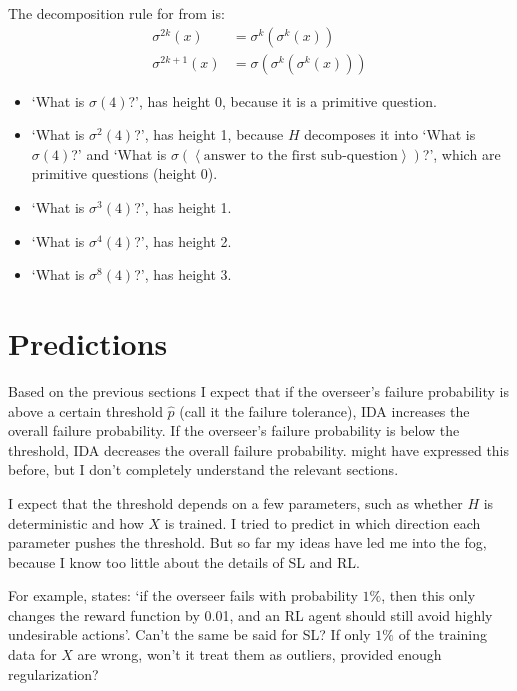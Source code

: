 \documentclass{farlamp}
\begin{document}
\begin{example}
    The decomposition rule for  from \textcite[table
    3]{CSASupAmp} is:
    \begin{align}
        \sigma^{2k}(x) &= \sigma^k(\sigma^k(x)) \\
        \sigma^{2k+1}(x) &= \sigma(\sigma^k(\sigma^k(x)))
    \end{align}

    \begin{itemize}
        \item ‘What is $\sigma(4)$?’, has height 0, because it is a primitive
            question.
        \item ‘What is $\sigma^2(4)$?’, has height 1, because $H$ decomposes it
            into ‘What is $\sigma(4)$?’ and ‘What is $\sigma(\left<\text{answer
            to the first sub-question}\right>)$?’, which are primitive questions
            (height 0).
        \item ‘What is $\sigma^3(4)$?’, has height 1.
        \item ‘What is $\sigma^4(4)$?’, has height 2.
        \item ‘What is $\sigma^8(4)$?’, has height 3.
    \end{itemize}
\end{example}


\section{Predictions}
\label{sec:prediction}

Based on the previous sections I expect that if the overseer's failure
probability is above a certain threshold $\hat{p}$ (call it the failure
tolerance), IDA increases the overall failure probability. If the overseer's
failure probability is below the threshold, IDA decreases the overall failure
probability. \textcite{ChriRelAmp} might have expressed this before, but I don't
completely understand the relevant sections.

I expect that the threshold depends on a few parameters, such as whether $H$ is
deterministic and how $X$ is trained. I tried to predict in which direction each
parameter pushes the threshold. But so far my ideas have led me into the fog,
because I know too little about the details of SL and RL.

For example, \textcite{ChriRelAmp} states: ‘if the overseer fails with
probability $1 \%$, then this only changes the reward function by 0.01, and an
RL agent should still avoid highly undesirable actions’. Can't the same be said
for SL? If only $1 \%$ of the training data for $X$ are wrong, won't it treat
them as outliers, provided enough regularization?
\end{document}
